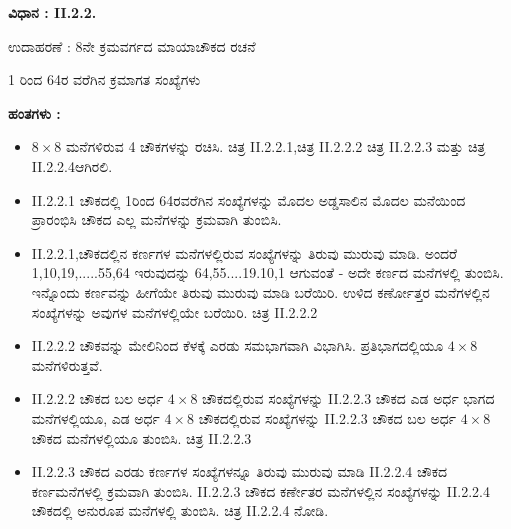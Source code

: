 \textbf{ವಿಧಾನ : II.2.2.}

ಉದಾಹರಣೆ : 8ನೇ ಕ್ರಮವರ್ಗದ ಮಾಯಾಚೌಕದ ರಚನೆ

1 ರಿಂದ 64ರ ವರೆಗಿನ ಕ್ರಮಾಗತ ಸಂಖ್ಯೆಗಳು

\textbf{ಹಂತಗಳು :}
\begin{itemize}
	\item $8 \times 8$ ಮನೆಗಳಿರುವ 4 ಚೌಕಗಳನ್ನು ರಚಿಸಿ. ಚಿತ್ರ II.2.2.1,ಚಿತ್ರ II.2.2.2 ಚಿತ್ರ II.2.2.3 ಮತ್ತು ಚಿತ್ರ II.2.2.4ಆಗಿರಲಿ.
	\item II.2.2.1 ಚೌಕದಲ್ಲಿ 1ರಿಂದ 64ರವರೆಗಿನ ಸಂಖ್ಯೆಗಳನ್ನು ಮೊದಲ ಅಡ್ಡಸಾಲಿನ ಮೊದಲ ಮನೆಯಿಂದ ಪ್ರಾರಂಭಿಸಿ ಚೌಕದ ಎಲ್ಲ ಮನೆಗಳನ್ನು ಕ್ರಮವಾಗಿ ತುಂಬಿಸಿ.
	\item II.2.2.1,ಚೌಕದಲ್ಲಿನ ಕರ್ಣಗಳ ಮನೆಗಳಲ್ಲಿರುವ ಸಂಖ್ಯೆಗಳನ್ನು ತಿರುವು ಮುರುವು ಮಾಡಿ. ಅಂದರೆ 1,10,19,.....55,64 ಇರುವುದನ್ನು 64,55....19.10,1 ಆಗುವಂತೆ - ಅದೇ ಕರ್ಣದ ಮನೆಗಳಲ್ಲಿ ತುಂಬಿಸಿ. ಇನ್ನೊಂದು ಕರ್ಣವನ್ನು ಹೀಗೆಯೇ ತಿರುವು ಮುರುವು ಮಾಡಿ ಬರೆಯಿರಿ. ಉಳಿದ ಕರ್ಣೋತ್ತರ ಮನೆಗಳಲ್ಲಿನ ಸಂಖ್ಯೆಗಳನ್ನು ಅವುಗಳ ಮನೆಗಳಲ್ಲಿಯೇ ಬರೆಯಿರಿ. ಚಿತ್ರ II.2.2.2
	\item II.2.2.2 ಚೌಕವನ್ನು ಮೇಲಿನಿಂದ ಕೆಳಕ್ಕೆ ಎರಡು ಸಮಭಾಗವಾಗಿ ವಿಭಾಗಿಸಿ. ಪ್ರತಿಭಾಗದಲ್ಲಿಯೂ $4 \times 8$ ಮನೆಗಳಿರುತ್ತವೆ.
	\item II.2.2.2 ಚೌಕದ ಬಲ ಅರ್ಧ $4 \times 8$ ಚೌಕದಲ್ಲಿರುವ ಸಂಖ್ಯೆಗಳನ್ನು II.2.2.3 ಚೌಕದ ಎಡ ಅರ್ಧ ಭಾಗದ ಮನೆಗಳಲ್ಲಿಯೂ, ಎಡ ಅರ್ಧ $4 \times 8$ ಚೌಕದಲ್ಲಿರುವ ಸಂಖ್ಯೆಗಳನ್ನು II.2.2.3 ಚೌಕದ ಬಲ ಅರ್ಧ $4 \times 8$ ಚೌಕದ ಮನೆಗಳಲ್ಲಿಯೂ ತುಂಬಿಸಿ. ಚಿತ್ರ II.2.2.3
	\item II.2.2.3 ಚೌಕದ ಎರಡು ಕರ್ಣಗಳ ಸಂಖ್ಯೆಗಳನ್ನೂ ತಿರುವು ಮುರುವು ಮಾಡಿ II.2.2.4 ಚೌಕದ ಕರ್ಣಮನೆಗಳಲ್ಲಿ ಕ್ರಮವಾಗಿ ತುಂಬಿಸಿ. II.2.2.3 ಚೌಕದ ಕರ್ಣೇತರ ಮನೆಗಳಲ್ಲಿನ ಸಂಖ್ಯೆಗಳನ್ನು II.2.2.4 ಚೌಕದಲ್ಲಿ ಅನುರೂಪ ಮನೆಗಳಲ್ಲಿ ತುಂಬಿಸಿ. ಚಿತ್ರ II.2.2.4 ನೋಡಿ.


\end{itemize}
